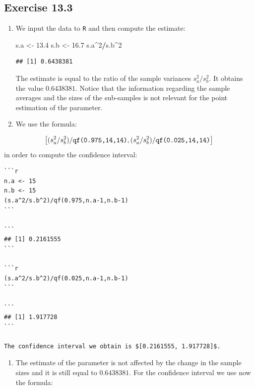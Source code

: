 \documentclass[
]{krantz}
\makeatletter
\newenvironment{Shaded}{\begin{snugshade}}{\end{snugshade}}
\newcommand{\DecValTok}[1]{\textcolor[rgb]{0.00,0.00,0.81}{#1}}
\newcommand{\FloatTok}[1]{\textcolor[rgb]{0.00,0.00,0.81}{#1}}
\newcommand{\NormalTok}[1]{#1}
\newcommand{\OperatorTok}[1]{\textcolor[rgb]{0.81,0.36,0.00}{\textbf{#1}}}
\newcommand{\StringTok}[1]{\textcolor[rgb]{0.31,0.60,0.02}{#1}}
\providecommand{\tightlist}{%
  \setlength{\itemsep}{0pt}\setlength{\parskip}{0pt}}
\newenvironment{kframe}{%
\medskip{}
\setlength{\fboxsep}{.8em}
 \def\at@end@of@kframe{}%
 \ifinner\ifhmode%
  \def\at@end@of@kframe{\end{minipage}}%
  \begin{minipage}{\columnwidth}%
 \fi\fi%
 \def\FrameCommand##1{\hskip\@totalleftmargin \hskip-\fboxsep
 \colorbox{shadecolor}{##1}\hskip-\fboxsep
     \hskip-\linewidth \hskip-\@totalleftmargin \hskip\columnwidth}%
 \MakeFramed {\advance\hsize-\width
   \@totalleftmargin\z@ \linewidth\hsize
   \@setminipage}}%
 {\par\unskip\endMakeFramed%
 \at@end@of@kframe}
\renewenvironment{Shaded}{\begin{kframe}}{\end{kframe}}
\theoremstyle{definition}
\theoremstyle{definition}
\theoremstyle{definition}
\theoremstyle{remark}
\makeatother
\begin{document}
\hypertarget{exercise-13.3}{%
\subsection*{Exercise 13.3}\label{exercise-13.3}}


\begin{enumerate}
\def\labelenumi{\arabic{enumi}.}
\item
  We input the data to \texttt{R} and then compute the estimate:

\begin{Shaded}
\begin{Highlighting}[]
\NormalTok{s.a <-}\StringTok{ }\FloatTok{13.4}
\NormalTok{s.b <-}\StringTok{ }\FloatTok{16.7}
\NormalTok{s.a}\OperatorTok{^}\DecValTok{2}\OperatorTok{/}\NormalTok{s.b}\OperatorTok{^}\DecValTok{2}
\end{Highlighting}
\end{Shaded}

\begin{verbatim}
## [1] 0.6438381
\end{verbatim}

  The estimate is equal to the ratio of the sample variances
  \(s_a^2/s_b^2\). It obtains the value \(0.6438381\). Notice that the
  information regarding the sample averages and the sizes of the
  sub-samples is not relevant for the point estimation of the parameter.
\item
  We use the formula:
\end{enumerate}

\[\big[(s_a^2/s_b^2)/\mbox{\texttt{qf(0.975,14,14)}} , (s_a^2/s_b^2)/\mbox{\texttt{qf(0.025,14,14)}}\big]\]
in order to compute the confidence interval:

\begin{verbatim}
```r
n.a <- 15
n.b <- 15
(s.a^2/s.b^2)/qf(0.975,n.a-1,n.b-1)
```

```
## [1] 0.2161555
```

```r
(s.a^2/s.b^2)/qf(0.025,n.a-1,n.b-1)
```

```
## [1] 1.917728
```

The confidence interval we obtain is $[0.2161555, 1.917728]$.
\end{verbatim}

\begin{enumerate}
\def\labelenumi{\arabic{enumi}.}
\setcounter{enumi}{2}
\tightlist
\item
  The estimate of the parameter is not
  affected by the change in the sample sizes and it is still equal to
  \(0.6438381\). For the confidence interval we use now the formula:
\end{enumerate}
\end{document}
